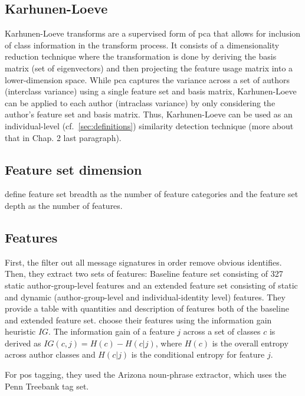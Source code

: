 \subsection{Karhunen-Loeve}
\label{sec:karhunen-loeve}

Karhunen-Loeve transforms are a supervised form of \ac{pca} that allows for inclusion of class information in the transform process.
It consists of a dimensionality reduction technique where the transformation is done by deriving the basis matrix (set of eigenvectors) and 
then projecting the feature usage matrix into a lower-dimension space.
While \ac{pca} captures the variance across a set of authors (interclass variance) using a single feature set and basis matrix, 
Karhunen-Loeve can be applied to each author (intraclass variance) by only considering the author's feature set and basis matrix.
Thus, Karhunen-Loeve can be used as an individual-level (cf.~\autoref{sec:definitions}) similarity detection technique 
(more about that in \citep{abbasi_writeprints_2008} Chap. 2 last paragraph).


\subsection{Feature set dimension}
\label{sec:feature-set-dimension}

\citet{abbasi_writeprints_2008} define feature set breadth as the number of feature categories and 
the feature set depth as the number of features.

\subsection{Features}

First, the \citet{abbasi_writeprints_2008} filter out all message signatures in order remove obvious identifies.
Then, they extract two sets of features: Baseline feature set consisting of 327 static author-group-level features and an 
extended feature set consisting of static and dynamic (author-group-level and individual-identity level) features.
They provide a table with quantities and description of features both of the baseline and extended feature set.
\citet{abbasi_writeprints_2008} choose their features using the information gain heuristic $IG$.
The information gain of a feature $j$ across a set of classes $c$ is derived as $IG(c,j)=H(c)-H(c|j)$, 
where $H(c)$ is the overall entropy across author classes and $H(c|j)$ is the conditional entropy for feature $j$.

For \ac{pos} tagging, they used the Arizona noun-phrase extractor, which uses the Penn Treebank tag set.